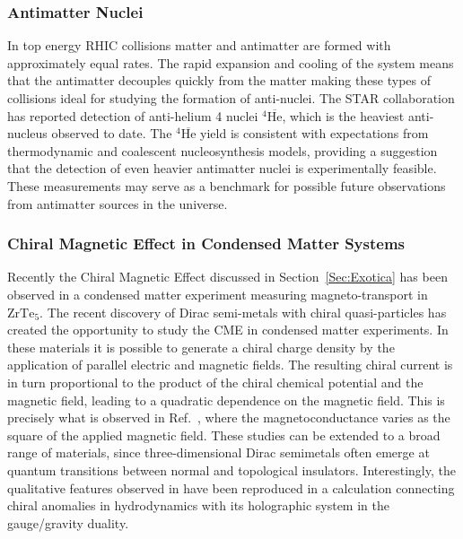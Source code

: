 \subsubsection{Antimatter Nuclei}
In top energy RHIC collisions matter and antimatter are formed with approximately equal rates. The rapid expansion and cooling of the system means that the antimatter decouples quickly from the matter making these types of collisions ideal for studying the formation of anti-nuclei. 
The STAR collaboration has reported detection of anti-helium 4 nuclei ${}^4\mathrm{\overline{He}}$, which is the heaviest anti-nucleus observed to date\cite{Agakishiev:2011ib}. 
The ${}^4\mathrm{\overline{He}}$ yield is consistent with expectations from thermodynamic and coalescent nucleosynthesis models, providing a suggestion
that the detection of even heavier antimatter nuclei is experimentally feasible. These measurements may serve as a benchmark for possible future observations from antimatter sources in the universe.


\subsubsection{Chiral Magnetic Effect in Condensed Matter Systems}
Recently the Chiral Magnetic Effect discussed in Section~\ref{Sec:Exotica} has been observed in a condensed matter experiment measuring magneto-transport in $\mathrm{ZrTe_5}$\cite{Li:2014bha}. 
The recent discovery of Dirac semi-metals 
with chiral quasi-particles\cite{Bor:2014aa,Neu:2014aa,Liu:2014aa} 
has created the opportunity to 
study the CME in condensed matter experiments. 
In these materials it is possible to generate a chiral charge density by the application 
of parallel electric and magnetic fields\cite{Fukushima:2008xe}.
The resulting chiral current is in turn proportional to the product of the 
chiral chemical potential and the magnetic field, leading to a quadratic dependence on the magnetic field.
This is precisely what is observed in Ref.~\cite{Li:2014bha},
where the magnetoconductance varies as the square of the applied magnetic field.
These studies can be extended to a broad range of materials, since three-dimensional 
Dirac semimetals often emerge at quantum transitions between normal and
topological insulators.
Interestingly, the qualitative features observed in \cite{Li:2014bha} 
have been reproduced in a calculation connecting chiral anomalies in 
hydrodynamics with its holographic system in the gauge/gravity duality\cite{Landsteiner:2014vua}. 
